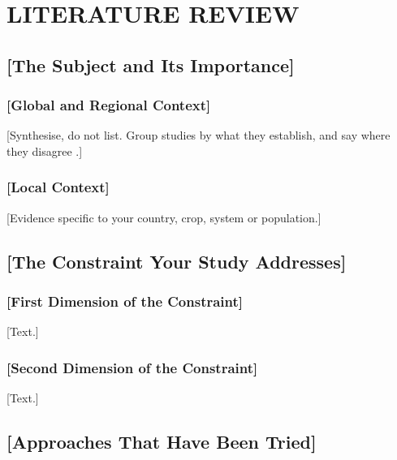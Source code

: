 \chapter{LITERATURE REVIEW}\label{ch:2}

\section{[The Subject and Its Importance]}\label{sec:2.1}

\subsection{[Global and Regional Context]}\label{sec:2.1.1}
{[}Synthesise, do not list. Group studies by what they establish, and say where they disagree \parencite{example_2020_article, example_2021_chapter}.]

\subsection{[Local Context]}\label{sec:2.1.2}
{[}Evidence specific to your country, crop, system or population.]

\section{[The Constraint Your Study Addresses]}\label{sec:2.2}

\subsection{[First Dimension of the Constraint]}\label{sec:2.2.1}
{[}Text.]

\subsection{[Second Dimension of the Constraint]}\label{sec:2.2.2}
{[}Text.]

\section{[Approaches That Have Been Tried]}\label{sec:2.3}


